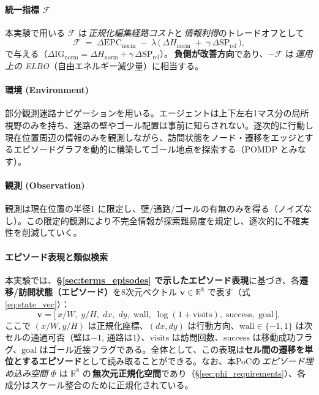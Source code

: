 \documentclass[ja=standard,xelatex]{bxjsarticle}
\newcommand{\F}{\mathcal{F}}
\begin{document}
\paragraph{統一指標 $\boldsymbol{\F}$}
本実験で用いる $\F$ は\,\emph{正規化編集経路コスト}と\,\emph{情報利得}のトレードオフとして
\begin{equation}
  \F\;=\;\Delta\mathrm{EPC}_{\mathrm{norm}}\; -\; \lambda\,\Big(\,\Delta H_{\mathrm{norm}}\; +\; \gamma\,\Delta\mathrm{SP}_{\mathrm{rel}}\,\Big),
  \label{eq:maze_F_definition}
\end{equation}
で与える（$\Delta\mathrm{IG}_{\mathrm{norm}}=\Delta H_{\mathrm{norm}}+\gamma\,\Delta\mathrm{SP}_{\mathrm{rel}}$）。\,\textbf{負側が改善方向}であり、$-\F$ は\,\emph{運用上の ELBO}（自由エネルギー減少量）に相当する。

\paragraph{環境 (Environment)}
部分観測迷路ナビゲーションを用いる。エージェントは上下左右1マス分の局所視野のみを持ち、迷路の壁やゴール配置は事前に知らされない。逐次的に行動し現在位置周辺の情報のみを観測しながら、訪問状態をノード・遷移をエッジとするエピソードグラフを動的に構築してゴール地点を探索する（POMDP とみなす）。

\paragraph{観測 (Observation)}
観測は現在位置の半径1 に限定し、壁/通路/ゴールの有無のみを得る（ノイズなし）。この限定的観測により不完全情報が探索難易度を規定し、逐次的に不確実性を削減していく。

\paragraph{エピソード表現と類似検索}
本実験では、\textbf{§\ref{sec:terms_episodes} で示したエピソード表現}に基づき、各\textbf{遷移/訪問状態（エピソード）}を8次元ベクトル $\mathbf{v} \in \mathbb{R}^8$ で表す（式\ref{eq:state_vec}）：
\begin{equation}
  \mathbf{v}=\big[\,x/W,\; y/H,\; dx,\; dy,\; \mathrm{wall},\; \log(1{+}\mathrm{visits}),\; \mathrm{success},\; \mathrm{goal}\,\big],\label{eq:state_vec}
\end{equation}
 ここで $(x/W, y/H)$ は正規化座標、$(dx, dy)$ は行動方向、$\mathrm{wall}\in\{-1,1\}$ は次セルの通過可否（壁は$-1$, 通路は$1$）、$\mathrm{visits}$ は訪問回数、$\mathrm{success}$ は移動成功フラグ、$\mathrm{goal}$ はゴール近接フラグである。全体として、この表現は\textbf{セル間の遷移を単位とするエピソード}として読み取ることができる。なお、本PoCの\,\emph{エピソード埋め込み空間} $\Phi$ は $\mathbb{R}^8$ の\,\textbf{無次元正規化空間}であり（§\ref{sec:phi_requirements}）、各成分はスケール整合のために正規化されている。
\end{document}

